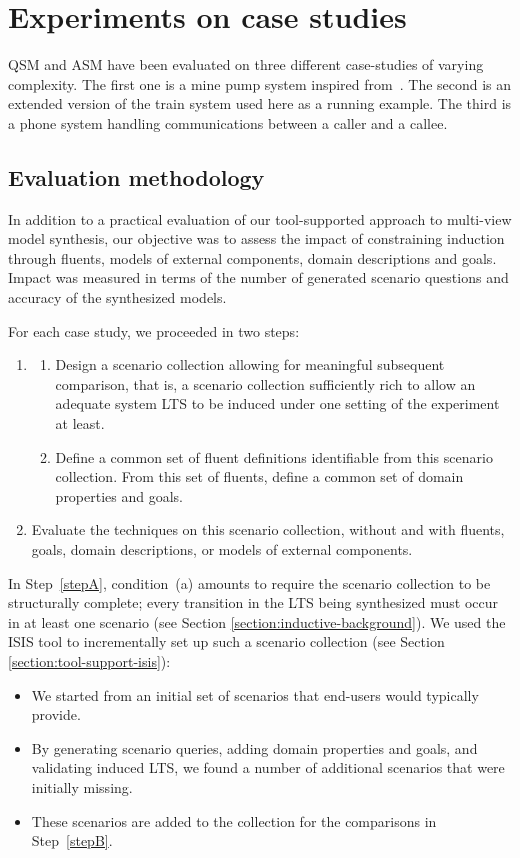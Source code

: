 \section{Experiments on case studies\label{section:evaluation-experiments-on-case-studies}}

QSM and ASM have been evaluated on three different case-studies of varying complexity. The first one is a mine pump system inspired from~\cite{Joseph:1996}. The second is an extended version of the train system used here as a running example. The third is a phone system handling communications between a caller and a callee.

\subsection{Evaluation methodology}

In addition to a practical evaluation of our tool-supported approach to multi-view model synthesis, our objective was to assess the impact of constraining induction through fluents, models of external components, domain descriptions and goals. Impact was measured in terms of the number of generated scenario questions and accuracy of the synthesized models.

For each case study, we proceeded in two steps:
\begin{enumerate}
\item\label{stepA}
\begin{enumerate}
\item\label{CondA} Design a scenario collection allowing for meaningful subsequent comparison, that is, a scenario collection sufficiently rich to allow an adequate system LTS to be induced under one setting of the experiment at least.
\item\label{CondB} Define a common set of fluent definitions identifiable from this scenario collection. From this set of fluents, define a common set of domain properties and goals.
\end{enumerate}
\item\label{stepB} Evaluate the techniques on this scenario collection, without and with fluents, goals, domain descriptions, or models of external components.
\end{enumerate}

In Step~\ref{stepA}, condition~(a) amounts to require the scenario collection to be structurally complete; every transition in the LTS being synthesized must occur in at least one scenario (see Section \ref{section:inductive-background}). We used the ISIS tool to incrementally set up such a scenario collection (see Section \ref{section:tool-support-isis}):
\begin{itemize}
\item We started from an initial set of scenarios that end-users would typically provide.
\item By generating scenario queries, adding domain properties and goals, and validating induced LTS, we found a number of additional scenarios that were initially missing. 
\item These scenarios are added to the collection for the comparisons in Step~\ref{stepB}.
\end{itemize}

